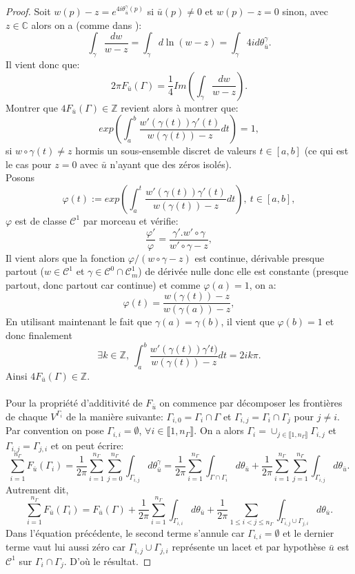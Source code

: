 \begin{proof}
    Soit $w(p)-z=e^{4i\theta_{\bar{u}}^\gamma(p)}$ si $\bar{u}(p)\neq 0$ et $w(p)-z=0$ sinon, avec $z\in\mathbb{C}$ alors on a (comme dans \cite{rudin1998analyse}):
    $$
    \int_\gamma\frac{dw}{w-z}=\int_\gamma d \ln(w-z)=\int_\gamma 4id\theta_{\bar{u}}^\gamma.
    $$
    Il vient donc que:
    $$
    2\pi F_{\bar{u}}(\Gamma)=\frac{1}{4}Im\left(\int_\gamma\frac{dw}{w-z}\right).
    $$
    Montrer que $4F_{\bar{u}}(\Gamma)\in\mathbb{Z}$ revient alors à montrer que:
    $$
    exp\left(\int_a^b\frac{w'(\gamma(t))\gamma'(t)}{w(\gamma(t))-z}dt\right)=1,
    $$
    si $w\circ\gamma(t)\neq z$ hormis un sous-ensemble discret de valeurs $t\in[a, b]$ (ce qui est le cas pour $z = 0$ avec $\bar{u}$ n’ayant que des zéros isolés).\\
    Posons
    $$
    \varphi(t):=exp\left(\int_a^t\frac{w'(\gamma(t))\gamma'(t)}{w(\gamma(t))-z}dt\right),~t\in[a,b],
    $$
    $\varphi$ est de classe $\mathcal{C}^1$ par morceau et vérifie:
    $$
    \frac{\varphi'}{\varphi}=\frac{\gamma'.w'\circ\gamma}{w'\circ\gamma-z},
    $$
    Il vient alors que la fonction $\varphi/(w\circ\gamma-z)$ est continue, dérivable presque partout ($w\in\mathcal{C}^1$ et $\gamma\in\mathcal{C}^0\cap\mathcal{C}^1_m$) de dérivée nulle donc elle est constante (presque partout, donc partout car continue) et comme $\varphi(a)=1$, on a:
    $$
    \varphi(t)=\frac{w(\gamma(t))-z}{w(\gamma(a))-z},
    $$
    En utilisant maintenant le fait que $\gamma(a)=\gamma(b)$, il vient que $\varphi(b)=1$ et donc finalement
    $$
    \exists k\in\mathbb{Z},~\int_a^b\frac{w'(\gamma(t))\gamma't)}{w(\gamma(t))-z}dt=2ik\pi.
    $$
    Ainsi $4F_{\bar{u}}(\Gamma)\in\mathbb{Z}$.\\\\
    Pour la propriété d'additivité de $F_{\bar{u}}$ on commence par décomposer les frontières de chaque $V^{\Gamma_i}$ de la manière suivante: $\Gamma_{i,0}=\Gamma_i\cap\Gamma$ et $\Gamma_{i,j}=\Gamma_i\cap\Gamma_j$ pour $j\neq i$. Par convention on pose $\Gamma_{i,i}=\emptyset$, $\forall i\in\llbracket 1, n_\Gamma\rrbracket$. On a alors $\Gamma_i=\cup_{j\in\llbracket1, n_\Gamma\rrbracket}\Gamma_{i,j}$ et $\Gamma_{i,j}=\Gamma_{j,i}$ et on peut écrire:
    $$
    \sum_{i=1}^{n_\Gamma}F_{\bar{u}}(\Gamma_i)=\frac{1}{2\pi}\sum_{i=1}^{n_\Gamma}\sum_{j=0}^{n_\Gamma}\int_{\Gamma_{i,j}}d\theta_{\bar{u}}^\gamma=\frac{1}{2\pi}\sum_{i=1}^{n_\Gamma}\int_{\Gamma\cap\Gamma_i}d\theta_{\bar{u}}+\frac{1}{2\pi}\sum_{i=1}^{n_\Gamma}\sum_{j=1}^{n_\Gamma}\int_{\Gamma_{i,j}}d\theta_{\bar{u}}.
    $$
    Autrement dit,
    $$
    \sum_{i=1}^{n_\Gamma}F_{\bar{u}}(\Gamma_i)=F_{\bar{u}}(\Gamma)+\frac{1}{2\pi}\sum_{i=1}^{n_\Gamma}\int_{\Gamma_{i,i}}d\theta_{\bar{u}}+\frac{1}{2\pi}\sum_{1\leq i<j\leq n_\Gamma}\int_{\Gamma_{i,j}\cup\Gamma_{j,i}}d\theta_{\bar{u}}.
    $$
    Dans l'équation précédente, le second terme s'annule car $\Gamma_{i,i}=\emptyset$ et le dernier terme vaut lui aussi zéro car $\Gamma_{i,j}\cup\Gamma_{j,i}$ représente un lacet et par hypothèse $\bar{u}$ est $\mathcal{C}^1$ sur $\Gamma_i\cap\Gamma_j$. D'où le résultat.
\end{proof}

